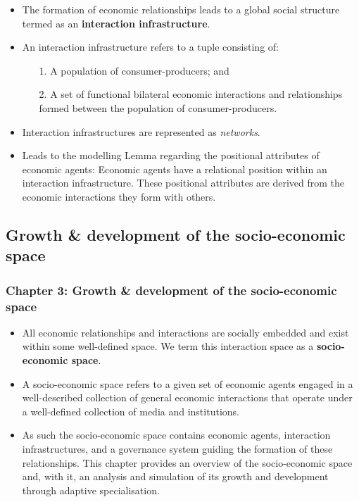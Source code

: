 \documentclass[10pt]{beamer}
\begin{document}
\begin{frame} %
\begin{itemize}
\item The formation of economic relationships leads to a global social structure termed as an \textbf{interaction infrastructure}.
\medskip
\item An interaction infrastructure refers to a tuple consisting of:
\begin{itemize}
\medskip
\item[1.] A population of consumer-producers; and
\medskip
\item[2.] A set of functional bilateral economic interactions and relationships formed between the population of consumer-producers.
\end{itemize}
\medskip
\item Interaction infrastructures are represented as \emph{networks}.
\medskip
\item Leads to the modelling Lemma regarding the positional attributes of economic agents: Economic agents have a relational position within an interaction infrastructure. These positional attributes are derived from the economic interactions they form with others.
\end{itemize}
\end{frame}

\subsection{Growth \& development of the socio-economic space}

\begin{frame} \frametitle{Chapter 3: Growth \& development of the socio-economic space}
\begin{itemize}
\item All economic relationships and interactions are socially embedded and exist within some well-defined space. We term this interaction space as a \textbf{socio-economic space}.
\medskip
\item A socio-economic space refers to a given set of economic agents engaged in a well-described collection of general economic interactions that operate under a well-defined collection of media and institutions.
\medskip
\item As such the socio-economic space contains economic agents, interaction infrastructures, and a governance system guiding the formation of these relationships.
\medskip
\ietm This chapter provides an overview of the socio-economic space and, with it, an analysis and simulation of its growth and development through adaptive specialisation.
\end{itemize}
\end{frame}
\end{document}
